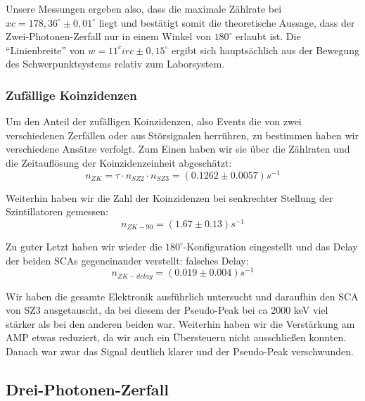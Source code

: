 Unsere Messungen ergeben also, dass die maximale Zählrate bei $xc = 178,36^\circ \pm 0,01^\circ$ liegt und bestätigt somit die theoretische Aussage, dass der Zwei-Photonen-Zerfall nur in einem Winkel von $180^\circ$ erlaubt ist. Die "`Linienbreite"' von $w = 11^circ \pm 0,15^\circ$ ergibt sich hauptsächlich aus der Bewegung des Schwerpunktsystems relativ zum Laborsystem. %

\subsubsection{Zufällige Koinzidenzen}

Um den Anteil der zufälligen Koinzidenzen, also Events die von zwei verschiedenen Zerfällen oder aus Störsignalen herrühren, zu bestimmen haben wir verschiedene Ansätze verfolgt. Zum Einen haben wir sie über die Zählraten und die Zeitauflösung der Koinzidenzeinheit abgeschätzt:
\begin{equation*}
 n_{ZK} = \tau \cdot n_{SZ2} \cdot n_{SZ3} = (0.1262 \pm 0.0057) s^{-1}
\end{equation*}

Weiterhin haben wir die Zahl der Koinzidenzen bei senkrechter Stellung der Szintillatoren gemessen:
\begin{equation*}
 n_{ZK-90} = (1.67  \pm  0.13) s^{-1}
\end{equation*}

Zu guter Letzt haben wir wieder die $180^\circ$-Konfiguration eingestellt und das Delay der beiden SCAs gegeneinander verstellt: 
falsches Delay:
\begin{equation*}
 n_{ZK-delay} = (0.019  \pm  0.004) s^{-1}
\end{equation*}
  


Wir haben die gesamte Elektronik ausführlich untersucht und daraufhin den SCA von SZ3 ausgetauscht, da bei diesem der Pseudo-Peak bei ca 2000 keV viel stärker als bei den anderen beiden war. Weiterhin haben wir die Verstärkung am AMP etwas reduziert, da wir auch ein Übersteuern nicht ausschließen konnten. Danach war zwar das Signal deutlich klarer und der Pseudo-Peak verschwunden.

\subsection{Drei-Photonen-Zerfall}

